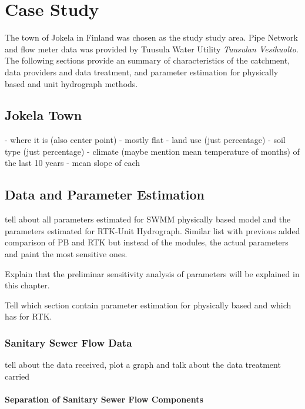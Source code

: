 
\chapter{Case Study}

The town of Jokela in Finland was chosen as the study study area. Pipe Network and flow meter data was provided by Tuusula Water Utility \textit{Tuusulan Vesihuolto}. The following sections provide an summary of characteristics of the catchment, data providers and data treatment, and parameter estimation for physically based and unit hydrograph methods.

\section{Jokela Town}

- where it is (also center point)
- mostly flat
- land use (just percentage)
- soil type (just percentage)
- climate (maybe mention mean temperature of months) of the last 10 years
- mean slope of each

\section{Data and Parameter Estimation}

tell about all parameters estimated for SWMM physically based model and the parameters estimated for RTK-Unit Hydrograph. Similar list with previous added comparison of PB and RTK but instead of the modules, the actual parameters and paint the most sensitive ones. 

Explain that the preliminar sensitivity analysis of parameters will be explained in this chapter. 

Tell which section contain parameter estimation for physically based and which has for RTK.


\subsection{Sanitary Sewer Flow Data} \label{flowdata}
    
    tell about the data received, plot a graph and talk about the data treatment carried
    
\subsubsection{Separation of Sanitary Sewer Flow Components}

